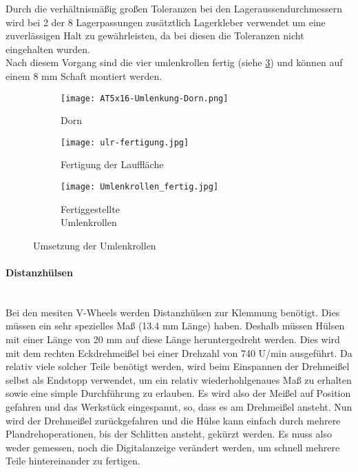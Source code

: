     Durch die verhältnismäßig großen Toleranzen bei den Lageraussendurchmessern wird bei 2 der 8 Lagerpassungen zusätztlich Lagerkleber verwendet um eine zuverlässigen Halt zu gewährleisten, da bei diesen die Toleranzen nicht eingehalten wurden. \\
    Nach diesem Vorgang sind die vier umlenkrollen fertig (siehe \ref{ulr:f2}) und können auf einem 8 mm Schaft montiert werden.

    \begin{figure}[H]
        \centering
        \begin{subfigure}{.3\textwidth}
            \centering
            \texttt{[image: AT5x16-Umlenkung-Dorn.png]}
            \caption{Dorn}
            \label{ulr:dorn}
        \end{subfigure}%
        \begin{subfigure}{.3\textwidth}
            \centering
            \texttt{[image: ulr-fertigung.jpg]}
            \caption{Fertigung der Lauffläche}
            \label{ulr:f1}
        \end{subfigure}%
        \begin{subfigure}{.3\textwidth}
            \centering
            \texttt{[image: Umlenkrollen\_fertig.jpg]}
            \centering
            \caption{Fertiggestellte \\Umlenkrollen}
            \label{ulr:f2}
        \end{subfigure}
        \caption{Umsetzung der Umlenkrollen}
        \label{ulr}
    \end{figure}

\paragraph{Distanzhülsen}\mbox{}\\
Bei den mesiten V-Wheels werden Distanzhülsen zur Klemmung benötigt. Dies müssen ein sehr spezielles Maß (13.4 mm Länge) haben. Deshalb müssen Hülsen mit einer Länge von 20 mm auf diese Länge heruntergedreht werden. Dies wird mit dem rechten Eckdrehmeißel bei einer Drehzahl von 740 U/min ausgeführt. Da relativ viele solcher Teile benötigt werden, wird beim Einspannen der Drehmeißel selbst als Endstopp verwendet, um ein relativ wiederhohlgenaues Maß zu erhalten sowie eine simple Durchführung zu erlauben. Es wird also der Meißel auf Position gefahren und das Werkstück eingespannt, so, dass es am Drehmeißel ansteht. Nun wird der Drehmeißel zurückgefahren und die Hülse kann einfach durch mehrere Plandrehoperationen, bis der Schlitten ansteht, gekürzt werden. Es muss also weder gemessen, noch die Digitalanzeige verändert werden, um schnell mehrere Teile hintereinander zu fertigen. 

